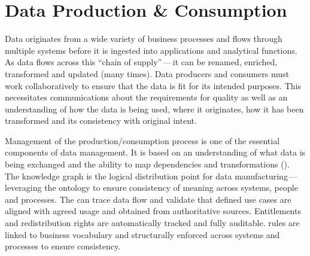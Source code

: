 \section{Data Production \& Consumption}\label{sec:ekg-mm-b-4-3} %

Data originates from a wide variety of business processes and flows through multiple systems before it is
ingested into applications and analytical functions.
As data flows across this “chain of supply”\,---\,it can be renamed, enriched, transformed and updated (many times).
Data producers and consumers must work collaboratively to ensure that the data is fit for its intended purposes.
This necessitates communications about the requirements for quality as well as an understanding of
how the data is being used, where it originates, how it has been transformed and its consistency with original intent.

\ekgmmContextSection

Management of the production/consumption process is one of the essential components of data management.
It is based on an understanding of what data is being exchanged and the ability to map dependencies and
transformations ().
The knowledge graph is the logical distribution point for data manufacturing\,---\,leveraging the ontology to ensure
consistency of meaning across systems, people and processes.
The  can trace data flow and validate that defined use cases are aligned with agreed usage and
obtained from authoritative sources.
Entitlements and redistribution rights are automatically tracked and fully auditable.
 rules are linked to business vocabulary and structurally enforced across systems and processes
to ensure consistency.

\kgmmcorequestionssection

